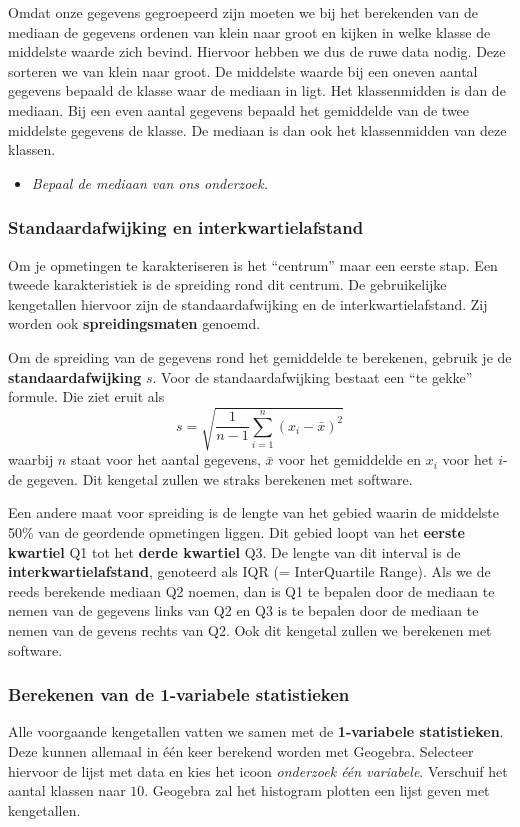 \documentclass[11pt]{article}
\newcommand{\vraag}[2]{\begin{itemize}\item {\it #1} \vspace*{#2}\end{itemize}}
\begin{document}
Omdat onze gegevens gegroepeerd zijn moeten we bij het berekenden van de mediaan de gegevens ordenen van klein naar groot en kijken in welke klasse de middelste waarde zich bevind. Hiervoor hebben we dus de ruwe data nodig. Deze sorteren we van klein naar groot. De middelste waarde bij een oneven aantal gegevens bepaald de klasse waar de mediaan in ligt. Het klassenmidden is dan de mediaan. Bij een even aantal gegevens bepaald het gemiddelde van de twee middelste gegevens de klasse. De mediaan is dan ook het klassenmidden van deze klassen.

\vraag{Bepaal de mediaan van ons onderzoek.}{4cm}

\subsubsection*{Standaardafwijking en interkwartielafstand}

Om je opmetingen te karakteriseren is het “centrum” maar een eerste stap. Een tweede karakteristiek
is de spreiding rond dit centrum. De gebruikelijke kengetallen hiervoor zijn de standaardafwijking en
de interkwartielafstand. Zij worden ook {\bf spreidingsmaten} genoemd.

Om de spreiding van de gegevens rond het gemiddelde te berekenen, gebruik je de
{\bf standaardafwijking} $s$. Voor de standaardafwijking bestaat een “te gekke” formule. Die ziet eruit als
$$
s = \sqrt{\frac{1}{n-1}\sum^n_{i=1}(x_i - \bar{x})^2}
$$
waarbij $n$ staat voor het aantal gegevens, $\bar{x}$ voor het gemiddelde en $x_i$ voor het $i$-de gegeven. Dit kengetal zullen we straks berekenen met software.

Een andere maat voor spreiding is de lengte van het gebied waarin de middelste 50\% van de
geordende opmetingen liggen. Dit gebied loopt van het {\bf eerste kwartiel} Q1 tot het {\bf derde kwartiel} Q3.
De lengte van dit interval is de {\bf interkwartielafstand}, genoteerd als IQR (= InterQuartile Range).
Als we de reeds berekende mediaan Q2 noemen, dan is Q1 te bepalen door de mediaan te nemen van de
gegevens links van Q2 en Q3 is te bepalen door de mediaan te nemen van de gevens rechts van Q2. Ook
dit kengetal zullen we berekenen met software.

\subsubsection{Berekenen van de 1-variabele statistieken}

Alle voorgaande kengetallen vatten we samen met de {\bf 1-variabele statistieken}. Deze kunnen allemaal
in één keer berekend worden met Geogebra. Selecteer hiervoor de lijst met data en kies het icoon 
{\it onderzoek één variabele}. Verschuif het aantal klassen naar $10$. Geogebra zal het histogram plotten
een lijst geven met kengetallen.
\end{document}
